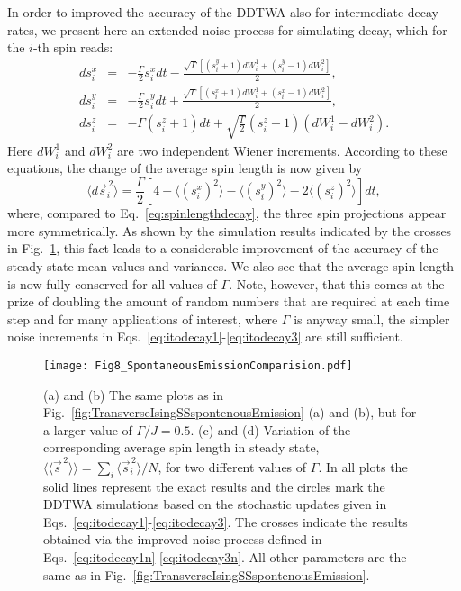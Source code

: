 \documentclass[pra,twocolumn,showpacs,preprintnumbers,amsmath,amssymb,superscriptaddress]{revtex4-1}
\newcommand{\erw}[1]{\langle#1\rangle}
\begin{document}
In order to improved the accuracy of the DDTWA also for intermediate decay rates, we present here an extended noise process for simulating decay, which for the $i$-th spin reads:
\begin{eqnarray}
\label{eq:itodecay1n}
ds_i^x&=& -\frac{\Gamma}{2} s_i^x dt -\frac{\sqrt{\Gamma}\left[(s_i^y+1) dW_i^1+(s_i^y-1) dW_i^2\right]}{2},\\
ds_i^y&=&-\frac{\Gamma}{2} s_i^y dt+\frac{\sqrt{\Gamma}\left[(s_i^x+1) dW_i^1+(s_i^x-1) dW_i^2\right]}{2},\\
ds_i^z&=& -\Gamma (s_i^z+1) dt +
\sqrt{\frac{\Gamma}{2}} (s_i^z+1) (dW_i^1-dW_i^2).
\label{eq:itodecay3n}
\end{eqnarray}
Here $dW_i^1$ and $dW_i^2$ are two independent Wiener increments. According to these equations, the change of the average spin length is now given by 
\begin{equation}
\langle d \vec s^{\,2}_i \rangle = \frac{\Gamma}{2} \left[4-\erw{(s^x_i)^2}-\erw{(s^y_i)^2}-2\erw{(s^z_i)^2}\right] dt,
\end{equation}
where, compared to Eq.~\eqref{eq:spinlengthdecay}, the three spin projections appear more symmetrically.  As shown by the simulation results indicated  by the crosses in Fig.~\ref{fig:TransverseIsingSSspontenousEmissionComparison}, this fact leads to a considerable improvement of the accuracy of the steady-state mean values and variances. We also see that the average spin length is now fully conserved for all values of $\Gamma$. Note, however, that this comes at the prize of doubling the amount of random numbers that are required at each time step and for many applications of interest, where $\Gamma$ is anyway small, the simpler noise increments in Eqs.~\eqref{eq:itodecay1}-\eqref{eq:itodecay3} are still sufficient. 


\begin{figure}[t]
		\centering
		\texttt{[image: Fig8\_SpontaneousEmissionComparision.pdf]}
		\caption{(a) and (b) The same plots as in Fig.~\ref{fig:TransverseIsingSSspontenousEmission} (a) and (b), but for a larger value of $\Gamma/J=0.5$. (c) and (d) Variation of the corresponding average spin length in steady state, $\langle\langle \vec s^{\,2}\rangle\rangle=\sum_i \langle \vec s_i^{\,2}\rangle/N $, for two different values of $\Gamma$. In all plots the solid lines represent  the exact results and the circles mark the DDTWA simulations based on the stochastic updates given in Eqs.~\eqref{eq:itodecay1}-\eqref{eq:itodecay3}. The crosses indicate the results obtained via the improved noise process defined in Eqs.~\eqref{eq:itodecay1n}-\eqref{eq:itodecay3n}. All other parameters are the same as in Fig.~\ref{fig:TransverseIsingSSspontenousEmission}.}
		\label{fig:TransverseIsingSSspontenousEmissionComparison}
\end{figure}
\end{document}
